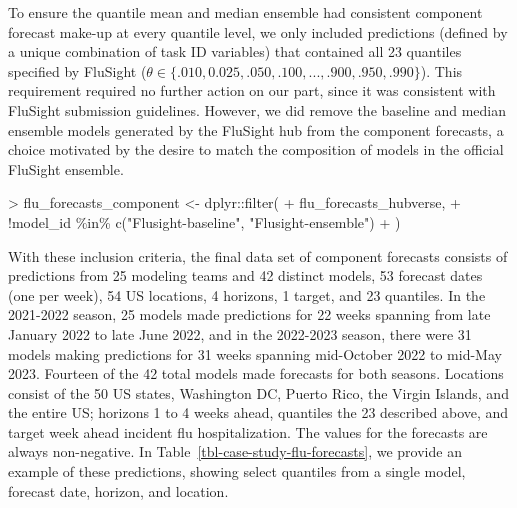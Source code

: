 \documentclass[
  letterpaper,
  DIV=11,
  numbers=noendperiod]{scrartcl}
\newenvironment{Shaded}{\begin{snugshade}}{\end{snugshade}}
\newcommand{\FunctionTok}[1]{\textcolor[rgb]{0.28,0.35,0.67}{#1}}
\newcommand{\NormalTok}[1]{\textcolor[rgb]{0.00,0.23,0.31}{#1}}
\newcommand{\OtherTok}[1]{\textcolor[rgb]{0.00,0.23,0.31}{#1}}
\newcommand{\SpecialCharTok}[1]{\textcolor[rgb]{0.37,0.37,0.37}{#1}}
\newcommand{\StringTok}[1]{\textcolor[rgb]{0.13,0.47,0.30}{#1}}
\begin{document}
To ensure the quantile mean and median ensemble had consistent component
forecast make-up at every quantile level, we only included predictions
(defined by a unique combination of task ID variables) that contained
all 23 quantiles specified by FluSight
(\(\theta \in \{.010, 0.025, .050, .100, ..., .900, .950, .990\}\)).
This requirement required no further action on our part, since it was
consistent with FluSight submission guidelines. However, we did remove
the baseline and median ensemble models generated by the FluSight hub
from the component forecasts, a choice motivated by the desire to match
the composition of models in the official FluSight ensemble.

\begin{Shaded}
\begin{Highlighting}[]
\SpecialCharTok{\textgreater{}}\NormalTok{ flu\_forecasts\_component }\OtherTok{\textless{}{-}}\NormalTok{ dplyr}\SpecialCharTok{::}\FunctionTok{filter}\NormalTok{(}
\SpecialCharTok{+}\NormalTok{   flu\_forecasts\_hubverse,}
\SpecialCharTok{+}   \SpecialCharTok{!}\NormalTok{model\_id }\SpecialCharTok{\%in\%} \FunctionTok{c}\NormalTok{(}\StringTok{"Flusight{-}baseline"}\NormalTok{, }\StringTok{"Flusight{-}ensemble"}\NormalTok{)}
\SpecialCharTok{+}\NormalTok{ )}
\end{Highlighting}
\end{Shaded}

With these inclusion criteria, the final data set of component forecasts
consists of predictions from 25 modeling teams and 42 distinct models,
53 forecast dates (one per week), 54 US locations, 4 horizons, 1 target,
and 23 quantiles. In the 2021-2022 season, 25 models made predictions
for 22 weeks spanning from late January 2022 to late June 2022, and in
the 2022-2023 season, there were 31 models making predictions for 31
weeks spanning mid-October 2022 to mid-May 2023. Fourteen of the 42
total models made forecasts for both seasons. Locations consist of the
50 US states, Washington DC, Puerto Rico, the Virgin Islands, and the
entire US; horizons 1 to 4 weeks ahead, quantiles the 23 described
above, and target week ahead incident flu hospitalization. The values
for the forecasts are always non-negative. In
Table~\ref{tbl-case-study-flu-forecasts}, we provide an example of these
predictions, showing select quantiles from a single model, forecast
date, horizon, and location.
\end{document}
